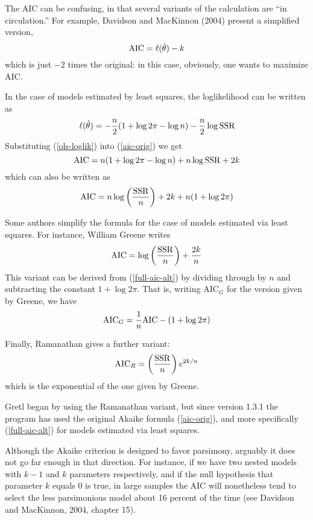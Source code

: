 The AIC can be confusing, in that several variants of the calculation
are ``in circulation.''  For example, Davidson and MacKinnon (2004)
present a simplified version,
%
\[
{\rm AIC} = \ell(\hat{\theta}) - k
\]
%
which is just $-2$ times the original: in this case, obviously, one
wants to maximize AIC.

In the case of models estimated by least squares, the loglikelihood
can be written as
%
\begin{equation}
\label{ols-loglik}
\ell(\hat{\theta}) = -\frac{n}{2}(1 + \log 2\pi - \log n)
 - \frac{n}{2} \log {\rm SSR}
\end{equation}
%
Substituting (\ref{ols-loglik}) into (\ref{aic-orig}) we get
%
\[
{\rm AIC} = n(1 + \log 2\pi - \log n) + n\log {\rm SSR} + 2k
\]
%
which can also be written as
%
\begin{equation}
\label{full-aic-alt}
{\rm AIC} = n\log \left( \frac{\rm SSR}{n} \right) + 2k + 
  n(1 + \log 2\pi)
\end{equation}
%

Some authors simplify the formula for the case of models estimated
via least squares.  For instance, William Greene writes
%
\begin{equation}
\label{aic-greene}
{\rm AIC} = \log \left( \frac{\rm SSR}{n} \right) + \frac{2k}{n}
\end{equation}
%
This variant can be derived from (\ref{full-aic-alt}) by dividing
through by $n$ and subtracting the constant $1 + \log 2\pi$.  That is,
writing AIC$_G$ for the version given by Greene, we have
%
\[
{\rm AIC}_G = \frac{1}{n} {\rm AIC} - (1 + \log 2\pi)
\]
%

Finally, Ramanathan gives a further variant:
%
\[
{\rm AIC}_R = \left( \frac{\rm SSR}{n} \right) e^{2k/n}
\]
%
which is the exponential of the one given by Greene.  

Gretl began by using the Ramanathan variant, but since version 1.3.1
the program has used the original Akaike formula (\ref{aic-orig}), and
more specifically (\ref{full-aic-alt}) for models estimated via least
squares.

\vspace{1ex}

Although the Akaike criterion is designed to favor parsimony, arguably
it does not go far enough in that direction.  For instance, if we have
two nested models with $k-1$ and $k$ parameters respectively, and if
the null hypothesis that parameter $k$ equals 0 is true, in large
samples the AIC will nonetheless tend to select the less parsimonious
model about 16 percent of the time (see Davidson and MacKinnon, 2004,
chapter 15).

